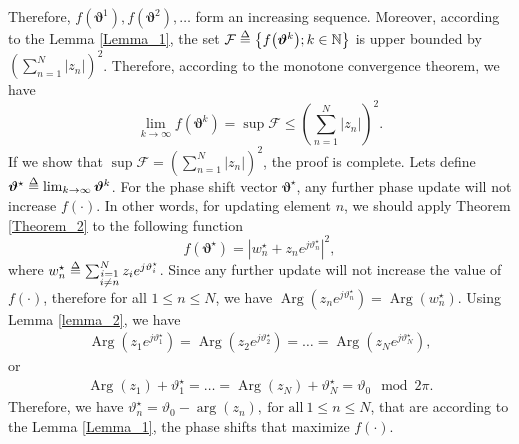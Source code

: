 \documentclass[conference]{IEEEtran}
\begin{document}
Therefore, $f{\left(\bm{\vartheta}^{1}\right)}, f{\left(\bm{\vartheta}^{2}\right)}, \dots$ form an increasing sequence. Moreover, according to the Lemma \ref{Lemma_1}, the set $\mathcal{F}\delequal\left\{f{\left(\bm{\vartheta}^{k}\right)}; k\in\mathbb{N}\right\}$ is upper bounded by $\left(\sum_{n=1}^{N}\left|z_{n}\right|\right)^{2}$. Therefore, according to the monotone convergence theorem, we have
\begin{equation}
    \lim_{k\to\infty}f{\left(\bm{\vartheta}^{k}\right)} = \sup{\mathcal{F}}\leq \left(\sum_{n=1}^{N}\left|z_{n}\right|\right)^{2}.
\end{equation}
If we show that $\sup{\mathcal{F}}=\left(\sum_{n=1}^{N}\left|z_{n}\right|\right)^{2}$, the proof is complete. Lets define $\bm{\vartheta}^{\star}\delequal\lim_{k\to\infty}\bm{\vartheta}^{k}$. For the phase shift vector $\bm{\vartheta}^{\star}$, any further phase update will not increase $f{\left(\cdot\right)}$. In other words, for updating element $n$, we should apply Theorem \ref{Theorem_2} to the following function  
\begin{equation}
    f{\left(\bm{\vartheta}^{\star}\right)} = \left|w_{n}^{\star}+z_{n}e^{j\vartheta^{\star}_{n}}\right|^2,
\end{equation}
where $w_{n}^{\star}\delequal \sum_{\substack{i=1\\i\neq n}}^{N} z_{i}e^{j\vartheta^{\star}_{i}}$. Since any further update will not increase the value of $f{\left(\cdot\right)}$, therefore for all $1\leq n\leq N$, we have $\operatorname{Arg}{\left(z_{n}e^{j\vartheta^{\star}_{n}}\right)}=\operatorname{Arg}{\left(w_{n}^{\star}\right)}$. Using Lemma \ref{lemma_2}, we have 
\begin{align}
    \operatorname{Arg}{\left(z_{1}e^{j\vartheta^{\star}_{1}}\right)}=\operatorname{Arg}{\left(z_{2}e^{j\vartheta^{\star}_{2}}\right)}=\dots = \operatorname{Arg}{\left(z_{N}e^{j\vartheta^{\star}_{N}}\right)},
\end{align}
or 
\begin{align}
    \operatorname{Arg}{\left(z_{1}\right)}+\vartheta^{\star}_{1}=\dots= \operatorname{Arg}{\left(z_{N}\right)}+\vartheta^{\star}_{N} = \vartheta_{0} \!\mod 2\pi.
\end{align}
Therefore, we have $\vartheta_{n}^{\star}=\vartheta_{0}-\arg{\left(z_{n}\right)}, \ \text{for all}\ 1\leq n\leq N$,
that are according to the Lemma \ref{Lemma_1}, the phase shifts that maximize $f{\left(\cdot\right)}$.
\end{document}
